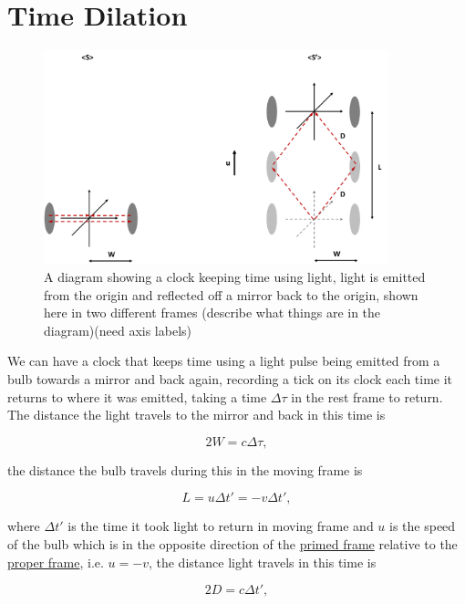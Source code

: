 \section{Time Dilation}

\begin{figure}[ht]
	\centering
	\includegraphics[width=10cm]{images/pdf/Light_clock.pdf}
	\caption{A diagram showing a clock keeping time using light, light is emitted from the origin and reflected off a mirror back to the origin, shown here in two different frames (describe what things are in the diagram)(need axis labels)}
	\label{fig: light clock}
\end{figure}

We can have a clock that keeps time using a light pulse being emitted from a bulb towards a mirror and back again, recording a tick on its clock each time it returns to where it was emitted, taking a time $\Delta \tau$ in the rest frame to return.
The distance the light travels to the mirror and back in this time is

\begin{equation}
	2W=c\Delta \tau,
\end{equation}

the distance the bulb travels during this in the moving frame is

\begin{equation}
	L=u\Delta t{'} = -v \Delta t{'},
\end{equation}

where $\Delta t{'}$ is the time it took light to return in moving frame and $u$ is the speed of the bulb which is in the opposite direction of the \hyperlink{def-Primed-Frame}{primed frame} relative to the \hyperlink{def-proper-frame}{proper frame}, i.e.
$u=-v$, the distance light travels in this time is

\begin{equation}
	2D = c \Delta t{'},
\end{equation}

